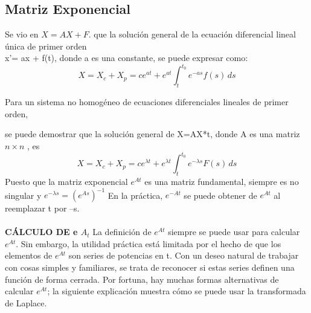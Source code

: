 \documentclass[11.5pt]{article}
\begin{document}
\subsection{Matriz Exponencial}

Se vio en \textbf{$X =AX + F.$} que la solución general de la ecuación diferencial lineal única de primer orden\\ x'= ax + f(t), donde a es una constante, se puede expresar como:\\
$$X=X_c+X_p=ce^{at}+e^{at}\int_{t}^{t_0} \!e^{-as}f(s)\,ds$$

Para un sistema no homogéneo de ecuaciones diferenciales lineales de primer orden,

se puede demostrar que la solución general de X=AX*t, donde A es una matriz $n\times n$     , es
$$X=X_c+X_p=ce^{\lambda t}+e^{\lambda t}\int_{t}^{t_0} \!e^{-\lambda s}F(s)\,ds$$
Puesto que la matriz exponencial $e^{At}$ es una matriz fundamental, siempre es no singular y
$e^{-\lambda s}=(e^{As})^{-1}$ En la práctica, $e^{-At}$ se puede obtener de $e^{At}$ al reemplazar t por –s.\\
\vspace{0.6cm}\\
\textbf{CÁLCULO DE e $ A_t$}
La definición de $e^{At}$ siempre se puede usar para calcular $e^{At}$. Sin embargo, la utilidad práctica  está limitada por el hecho de que los elementos de $e^{At}$ son series de potencias en t. Con un deseo natural de trabajar con cosas simples y familiares, se trata de reconocer si estas series definen una función de forma cerrada. Por fortuna, hay muchas formas alternativas de calcular $e^{At}$; la siguiente explicación muestra cómo se puede usar la transformada de Laplace.
\end{document}
